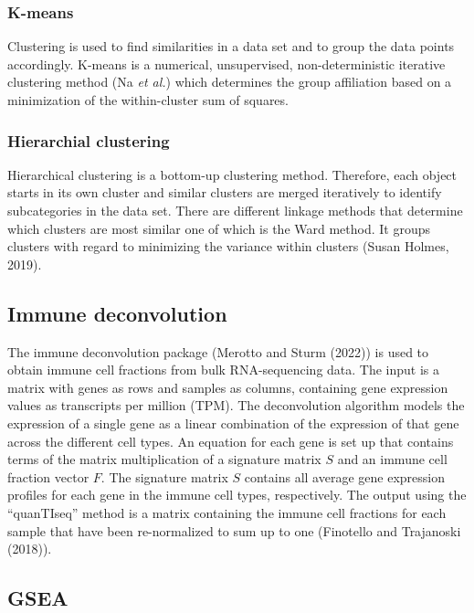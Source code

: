 \documentclass[
  parskip,
  oneside]{scrreprt}
\begin{document}
\hypertarget{k-means}{%
\subsubsection{K-means}\label{k-means}}

Clustering is used to find similarities in a data set and to group the
data points accordingly. K-means is a numerical, unsupervised,
non-deterministic iterative clustering method (Na \emph{et al.}) which
determines the group affiliation based on a minimization of the
within-cluster sum of squares.

\hypertarget{hierarchial-clustering}{%
\subsubsection{Hierarchial clustering}\label{hierarchial-clustering}}

Hierarchical clustering is a bottom-up clustering method. Therefore,
each object starts in its own cluster and similar clusters are merged
iteratively to identify subcategories in the data set. There are
different linkage methods that determine which clusters are most similar
one of which is the Ward method. It groups clusters with regard to
minimizing the variance within clusters (Susan Holmes, 2019).

\hypertarget{immune-deconvolution}{%
\subsection{Immune deconvolution}\label{immune-deconvolution}}

The immune deconvolution package (Merotto and Sturm (2022)) is used to
obtain immune cell fractions from bulk RNA-sequencing data. The input is
a matrix with genes as rows and samples as columns, containing gene
expression values as transcripts per million (TPM). The deconvolution
algorithm models the expression of a single gene as a linear combination
of the expression of that gene across the different cell types. An
equation for each gene is set up that contains terms of the matrix
multiplication of a signature matrix \(S\) and an immune cell fraction
vector \(F\). The signature matrix \(S\) contains all average gene
expression profiles for each gene in the immune cell types,
respectively. The output using the ``quanTIseq'' method is a matrix
containing the immune cell fractions for each sample that have been
re-normalized to sum up to one (Finotello and Trajanoski (2018)).

\hypertarget{gsea}{%
\subsection{GSEA}\label{gsea}}
\end{document}
